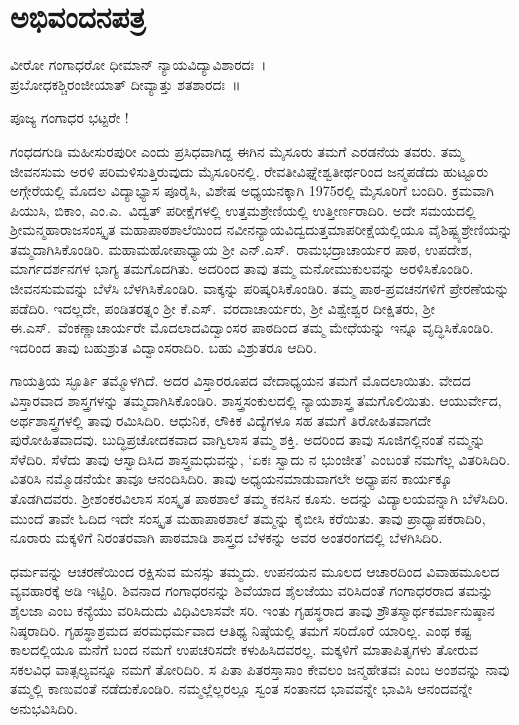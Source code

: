 {\fontsize{14}{16}\selectfont
\chapter{ಅಭಿವಂದನಪತ್ರ}

\begin{center}
ವೀರೋ ಗಂಗಾಧರೋ ಧೀಮಾನ್ ನ್ಯಾಯವಿದ್ಯಾವಿಶಾರದಃ~।\\
ಪ್ರಬೋಧಕಶ್ಚಿರಂಜೀಯಾತ್ ದೀವ್ಯಾತ್ತು ಶತಶಾರದಃ~॥
\end{center}

ಪೂಜ್ಯ ಗಂಗಾಧರ ಭಟ್ಟರೇ !

ಗಂಧದಗುಡಿ ಮಹೀಸುರಪುರೀ ಎಂದು ಪ್ರಸಿಧವಾಗಿದ್ದ ಈಗಿನ ಮೈಸೂರು ತಮಗೆ ಎರಡನೆಯ ತವರು. ತಮ್ಮ ಜೀವನಸುಮ ಅರಳಿ ಪರಿಮಳಿಸುತ್ತಿರುವುದು ಮೈಸೂರಿ\-ನಲ್ಲಿ. ರೇವತೀವಿಘ್ನೇಶ್ವತೀರ್ಥರಿಂದ ಜನ್ಮಪಡೆದು ಹುಟ್ಟೂರು ಅಗ್ಗೇರೆಯಲ್ಲಿ ಮೊದಲ ವಿದ್ಯಾಭ್ಯಾಸ ಪೂರೈಸಿ, ವಿಶೇಷ ಅಧ್ಯಯನಕ್ಕಾಗಿ 1975ರಲ್ಲಿ ಮೈಸೂರಿಗೆ ಬಂದಿರಿ. ಕ್ರಮವಾಗಿ ಪಿಯುಸಿ, ಬಿಕಾಂ, ಎಂ.ಎ.\ ವಿದ್ವತ್ ಪರೀಕ್ಷೆಗಳಲ್ಲಿ ಉತ್ತಮಶ್ರೇಣಿಯಲ್ಲಿ ಉತ್ತೀರ್ಣರಾದಿರಿ. ಅದೇ ಸಮಯದಲ್ಲಿ ಶ್ರೀಮನ್ಮಹಾರಾಜಸಂಸ್ಕೃತ ಮಹಾಪಾಠಶಾಲೆಯಿಂದ ನವೀನನ್ಯಾಯವಿದ್ವದುತ್ತಮಾಪರೀಕ್ಷೆಯಲ್ಲಿಯೂ ವೈಶಿಷ್ಟ್ಯಶ್ರೇಣಿಯನ್ನು ತಮ್ಮದಾಗಿಸಿಕೊಂಡಿರಿ. ಮಹಾಮಹೋಪಾಧ್ಯಾಯ ಶ್ರೀ ಎನ್.ಎಸ್.\ ರಾಮಭದ್ರಾಚಾರ್ಯರ ಪಾಠ, ಉಪದೇಶ, ಮಾರ್ಗದರ್ಶನಗಳ ಭಾಗ್ಯ ತಮಗೊದಗಿತು. ಅದರಿಂದ ತಾವು ತಮ್ಮ ಮನೋಮುಕುಲವನ್ನು ಅರಳಿಸಿಕೊಂಡಿರಿ. ಜೀವನಸುಮವನ್ನು ಬೆಳೆಸಿ ಬೆಳಗಿಸಿಕೊಂಡಿರಿ. ವಾಕ್ಕನ್ನು ಪರಿಷ್ಕರಿಸಿಕೊಂಡಿರಿ. ತಮ್ಮ ಪಾಠ-ಪ್ರವಚನಗಳಿಗೆ ಪ್ರೇರಣೆಯನ್ನು ಪಡೆದಿರಿ. ಇದಲ್ಲದೇ, ಪಂಡಿತರತ್ನಂ ಶ್ರೀ ಕೆ.ಎಸ್.\ ವರದಾಚಾರ್ಯರು, ಶ್ರೀ ವಿಶ್ವೇಶ್ವರ ದೀಕ್ಷಿತರು, ಶ್ರೀ ಈ.ಎಸ್.\ ವೆಂಕಣ್ಣಾಚಾರ್ಯರೇ ಮೊದಲಾದವಿದ್ವಾಂಸರ ಪಾಠದಿಂದ ತಮ್ಮ ಮೇಧೆಯನ್ನು ಇನ್ನೂ ವೃದ್ಧಿಸಿಕೊಂಡಿರಿ. ಇದರಿಂದ ತಾವು ಬಹುಶ್ರುತ ವಿದ್ವಾಂಸರಾದಿರಿ. ಬಹು ವಿಶ್ರುತರೂ ಆದಿರಿ.

ಗಾಯತ್ರಿಯ ಸ್ಫೂರ್ತಿ ತಮ್ಮೊಳಗಿದೆ. ಅದರ ವಿಸ್ತಾರರೂಪದ ವೇದಾಧ್ಯಯನ ತಮಗೆ ಮೊದಲಾಯಿತು. ವೇದದ ವಿಸ್ತಾರವಾದ ಶಾಸ್ತ್ರಗಳನ್ನು ತಮ್ಮದಾಗಿಸಿಕೊಂಡಿರಿ. ಶಾಸ್ತ್ರಸಂಕುಲದಲ್ಲಿ ನ್ಯಾಯಶಾಸ್ತ್ರ ತಮಗೊಲಿಯಿತು. ಆಯುರ್ವೇದ, ಅರ್ಥಶಾಸ್ತ್ರ\-ಗಳಲ್ಲಿ ತಾವು ರಮಿಸಿದಿರಿ. ಆಧುನಿಕ, ಲೌಕಿಕ ವಿದ್ಯೆ\-ಗಳೂ ಸಹ ತಮಗೆ ತಿರೋಹಿತವಾಗದೇ ಪುರೋಹಿತವಾದವು. ಬುದ್ಧಿಪ್ರಚೋದಕವಾದ ವಾಗ್ವಿಲಾಸ ತಮ್ಮ ಶಕ್ತಿ. ಅದರಿಂದ ತಾವು ಸೂಜಿಗಲ್ಲಿನಂತೆ ನಮ್ಮನ್ನು ಸೆಳೆದಿರಿ. ಸೆಳೆದು ತಾವು ಆಸ್ವಾದಿಸಿದ ಶಾಸ್ತ್ರಮಧುವನ್ನು,  `ಏಕಃ ಸ್ವಾದು ನ ಭುಂಜೀತ’ ಎಂಬಂತೆ ನಮಗೆಲ್ಲ ವಿತರಿಸಿದಿರಿ. ವಿತರಿಸಿ ನಮ್ಮೊಡನೆಯೇ ತಾವೂ ಆನಂದಿಸಿದಿರಿ. ತಾವು ಅಧ್ಯಯನಮಾಡುವಾಗಲೇ ಅಧ್ಯಾಪನ ಕಾರ್ಯಕ್ಕೂ ತೊಡಗಿದವರು. ಶ್ರೀಶಂಕರವಿಲಾಸ ಸಂಸ್ಕೃತ ಪಾಠಶಾಲೆ ತಮ್ಮ ಕನಸಿನ ಕೂಸು. ಅದನ್ನು ವಿದ್ಯಾಲಯ\-ವನ್ನಾಗಿ ಬೆಳೆಸಿದಿರಿ. ಮುಂದೆ ತಾವೇ ಓದಿದ ಇದೇ ಸಂಸ್ಕೃತ ಮಹಾಪಾಠಶಾಲೆ ತಮ್ಮನ್ನು ಕೈಬೀಸಿ ಕರೆಯಿತು. ತಾವು ಪ್ರಾಧ್ಯಾಪಕರಾದಿರಿ, ನೂರಾರು ಮಕ್ಕಳಿಗೆ ನಿರಂತರವಾಗಿ ಪಾಠಮಾಡಿ ಶಾಸ್ತ್ರದ ಬೆಳಕನ್ನು ಅವರ ಅಂತರಂಗದಲ್ಲಿ ಬೆಳಗಿಸಿದಿರಿ. 

ಧರ್ಮವನ್ನು ಆಚರಣೆಯಿಂದ ರಕ್ಷಿಸುವ ಮನಸ್ಸು ತಮ್ಮದು. ಉಪನಯನ ಮೂಲದ ಆಚಾರದಿಂದ ವಿವಾಹಮೂಲದ ವ್ಯವಹಾರಕ್ಕೆ ಅಡಿ ಇಟ್ಟಿರಿ. ಶಿವನಾದ ಗಂಗಾಧರ\-ನನ್ನು ಶಿವೆಯಾದ ಶೈಲಜೆಯು ವರಿಸಿದಂತೆ ಗಂಗಾಧರರಾದ ತಮನ್ನು ಶೈಲಜಾ ಎಂಬ ಕನ್ಯೆಯು ವರಿಸಿದುದು ವಿಧಿವಿಲಾಸವೇ ಸರಿ. ಇಂತು ಗೃಹಸ್ಥರಾದ ತಾವು ಶ್ರೌತಸ್ಮಾರ್ಥಕರ್ಮಾನುಷ್ಠಾನ ನಿಷ್ಠರಾದಿರಿ. ಗೃಹಸ್ಥಾಶ್ರಮದ ಪರಮಧರ್ಮವಾದ ಆತಿಥ್ಯ ನಿಷ್ಠೆಯಲ್ಲಿ ತಮಗೆ ಸರಿದೊರೆ ಯಾರಿಲ್ಲ. ಎಂಥ ಕಷ್ಟ ಕಾಲದಲ್ಲಿಯೂ ಮನೆಗೆ ಬಂದ ನಮಗೆ ಉಪಚರಿಸದೇ ಕಳುಹಿಸಿದವರಲ್ಲ. ಮಕ್ಕಳಿಗೆ ಮಾತಾಪಿತೃಗಳು ತೋರುವ ಸಕಲವಿಧ ವಾತ್ಸಲ್ಯವನ್ನೂ ನಮಗೆ ತೋರಿದಿರಿ. ಸ ಪಿತಾ ಪಿತರಸ್ತಾಸಾಂ ಕೇವಲಂ ಜನ್ಮಹೇತವಃ ಎಂಬ ಅಂಶವನ್ನು ನಾವು ತಮ್ಮಲ್ಲಿ ಕಾಣುವಂತೆ ನಡೆದುಕೊಂಡಿರಿ. ನಮ್ಮಲ್ಲೆಲ್ಲರಲ್ಲೂ ಸ್ವಂತ ಸಂತಾನದ ಭಾವವನ್ನೇ ಭಾವಿಸಿ ಆನಂದವನ್ನೇ ಅನುಭವಿಸಿದಿರಿ. 

}
